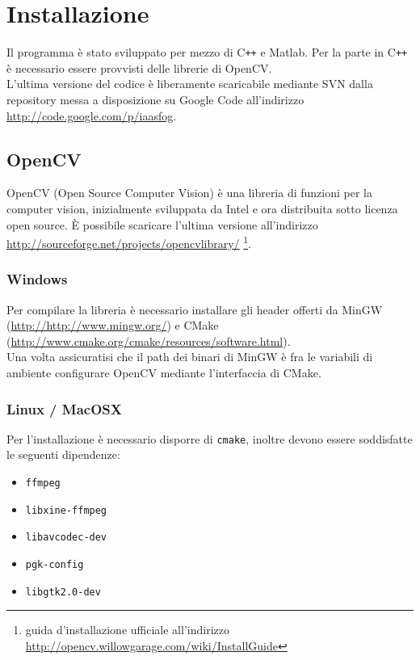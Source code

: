 \documentclass[12pt]{report}
\begin{document}
\chapter{Installazione}
\noindent Il programma \`e stato sviluppato per mezzo di C\verb|++| e Matlab. Per la parte in C\verb|++| \`e necessario essere provvisti delle librerie di OpenCV.\\
L'ultima versione del codice \`e liberamente scaricabile mediante SVN dalla repository messa a disposizione su Google Code all'indirizzo \url{http://code.google.com/p/iaasfog}.
\section{OpenCV}

OpenCV (Open Source Computer Vision) \`e una libreria di funzioni per la computer vision, inizialmente sviluppata da Intel e ora distribuita sotto licenza open source. \`E possibile scaricare l'ultima versione all'indirizzo \url{http://sourceforge.net/projects/opencvlibrary/} \footnote{guida d'installazione ufficiale all'indirizzo \url{http://opencv.willowgarage.com/wiki/InstallGuide}}.

\subsection{Windows}

Per compilare la libreria \`e necessario installare gli header offerti da MinGW (\url{http://http://www.mingw.org/}) e CMake (\url{http://www.cmake.org/cmake/resources/software.html}).\\
\noindent Una volta assicuratisi che il path dei binari di MinGW \`e fra le variabili di ambiente configurare OpenCV mediante l'interfaccia di CMake.

\subsection{Linux / MacOSX}

\noindent Per l'installazione \`e necessario disporre di \verb|cmake|, inoltre devono essere soddisfatte le seguenti dipendenze:
\begin{itemize}
\item \verb|ffmpeg|
\item \verb|libxine-ffmpeg|
\item \verb|libavcodec-dev|
\item \verb|pgk-config|
\item \verb|libgtk2.0-dev|
\end{itemize}
\end{document}
